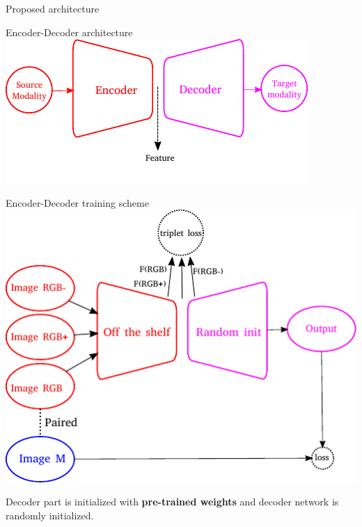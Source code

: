 \begin{frame}{Proposed architecture}	
	\begin{minipage}[c]{0.48\linewidth}
		\begin{block}{Encoder-Decoder architecture}
			\includegraphics[width=\linewidth]{vect/encoderdecoder.pdf}					
		\end{block}
	\end{minipage}
	\hfill
	\begin{minipage}[c]{0.48\linewidth}
		\begin{block}{Encoder-Decoder training scheme}
			\includegraphics[width=\linewidth]{vect/encoderdecoder_training.pdf}	
		\end{block}
	\end{minipage}
	\vfill
	Decoder part is initialized with \textbf{pre-trained weights} and decoder network is randomly initialized.				
\end{frame}

